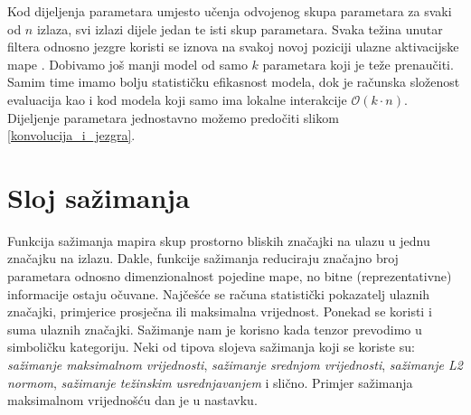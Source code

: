 \documentclass[times, utf8, diplomski]{fer}
\theoremstyle{definition}
\begin{document}
Kod dijeljenja parametara umjesto učenja odvojenog skupa parametara za svaki od $n$ izlaza, svi izlazi dijele jedan te isti skup parametara. Svaka težina unutar filtera odnosno jezgre koristi se iznova na svakoj novoj poziciji ulazne aktivacijske mape . Dobivamo još manji model od samo $k$ parametara koji je teže prenaučiti. Samim time imamo bolju statističku efikasnost modela, dok je računska složenost evaluacija kao i kod modela koji samo ima lokalne interakcije $\mathcal{O}(k\cdot n)$. Dijeljenje parametara jednostavno možemo predočiti slikom \ref{konvolucija_i_jezgra}.

\section{Sloj sažimanja}
Funkcija sažimanja  mapira skup prostorno bliskih značajki na ulazu u jednu značajku na izlazu. Dakle, funkcije sažimanja reduciraju značajno broj parametara odnosno dimenzionalnost pojedine mape, no bitne (reprezentativne) informacije ostaju očuvane. Najčešće se računa statistički pokazatelj ulaznih značajki, primjerice prosječna ili maksimalna vrijednost. Ponekad se koristi i suma ulaznih značajki. Sažimanje nam je korisno kada tenzor prevodimo u simboličku kategoriju. Neki od tipova slojeva sažimanja koji se koriste su: \textit{sažimanje maksimalnom vrijednosti}, \textit{sažimanje srednjom vrijednosti}, \textit{sažimanje L2 normom}, \textit{sažimanje težinskim usrednjavanjem} i slično. Primjer sažimanja maksimalnom vrijednošću dan je u nastavku.
\end{document}
